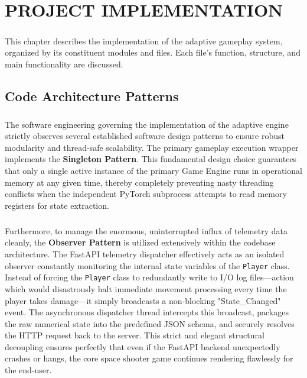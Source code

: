\chapter{\MakeUppercase{Project implementation}}

\paragraph{} This chapter describes the implementation of the adaptive gameplay system, organized by its constituent modules and files. Each file's function, structure, and main functionality are discussed.

\section{Code Architecture Patterns}
\paragraph{} The software engineering governing the implementation of the adaptive engine strictly observes several established software design patterns to ensure robust modularity and thread-safe scalability. The primary gameplay execution wrapper implements the \textbf{Singleton Pattern}. This fundamental design choice guarantees that only a single active instance of the primary Game Engine runs in operational memory at any given time, thereby completely preventing nasty threading conflicts when the independent PyTorch subprocess attempts to read memory registers for state extraction.
\paragraph{} Furthermore, to manage the enormous, uninterrupted influx of telemetry data cleanly, the \textbf{Observer Pattern} is utilized extensively within the codebase architecture. The FastAPI telemetry dispatcher effectively acts as an isolated observer constantly monitoring the internal state variables of the \texttt{Player} class. Instead of forcing the \texttt{Player} class to redundantly write to I/O log files---action which would disastrously halt immediate movement processing every time the player takes damage---it simply broadcasts a non-blocking "State\_Changed" event. The asynchronous dispatcher thread intercepts this broadcast, packages the raw numerical state into the predefined JSON schema, and securely resolves the HTTP request back to the server. This strict and elegant structural decoupling ensures perfectly that even if the FastAPI backend unexpectedly crashes or hangs, the core space shooter game continues rendering flawlessly for the end-user.

